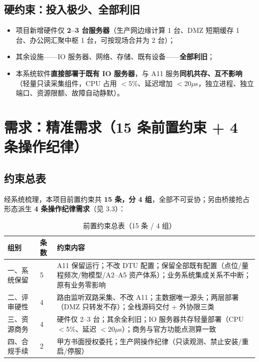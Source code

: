 \documentclass[11pt,a4paper]{ctexart}
\begin{document}
\subsection{硬约束：投入极少、全部利旧}

\begin{itemize}[leftmargin=*]
  \item 项目新增硬件仅 \textbf{2--3 台服务器}（生产网边缘计算 1 台、DMZ 短期缓存 1 台、办公网汇聚中枢 1 台，可按现场合并为 2 台）；
  \item 其余设施——IO 服务器、网络、存储、既有设备——\textbf{全部利旧}；
  \item 本系统软件\textbf{直接部署于既有 IO 服务器}，与 A11 服务\textbf{同机共存、互不影响}（轻量只读采集组件，CPU 占用 $<$5\%、延迟增加 $<$20$\mu$s，独立进程、独立端口、资源限额、故障自动静默）。
\end{itemize}

\section{需求：精准需求（15 条前置约束 + 4 条操作纪律）}

\subsection{约束总表}

经系统梳理，本项目前置约束共 \textbf{15 条，分 4 组}，全部不可妥协；另由桥接抢占形态派生 \textbf{4 条操作纪律需求}（见 3.3）：

\begin{table}[H]\centering
\caption{前置约束总表（15 条 / 4 组）}
\begin{tabular}{p{2.4cm} p{2.2cm} p{9.2cm}}
\toprule
\textbf{组别} & \textbf{条数} & \textbf{约束内容} \\
\midrule
一、系统保留 & 5 & A11 保留运行；不改 DTU 配置；保留全部既有配置（点位/量程频次/物模型/A2--A5 资产体系）；业务系统集成关系不中断；原有业务零影响 \\
二、评审硬性 & 4 & 路由监听双路采集、不改 A11；主数据唯一源头；两层部署（DMZ 只转发不存）；全栈源码交付 + 外协限三类 \\
三、资源商务 & 4 & 硬件仅 2--3 台；其余全利旧；IO 服务器共存轻量部署（CPU $<$5\%、延迟 $<$20$\mu$s）；商务与官方功能点测算一致 \\
四、合规手续 & 2 & 甲方书面授权委托；生产网操作纪律（只读观测、禁止安装/重启/停服） \\
\bottomrule
\end{tabular}
\end{table}
\end{document}
